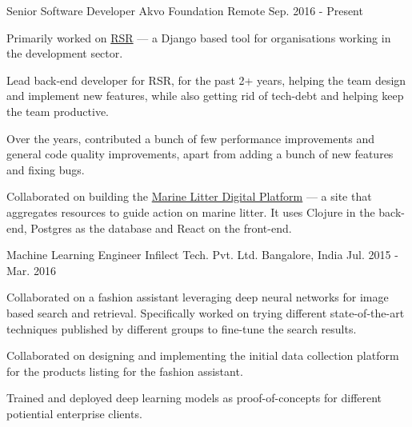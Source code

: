 

\begin{cventries}

  \cventry
      {Senior Software Developer} %
      {Akvo Foundation} %
      {Remote} %
      {Sep. 2016 - Present} %
      {
        \begin{cvitems} %
        \item {Primarily worked on \href{https://github.com/akvo/akvo-rsr}{RSR} --- a Django based tool for organisations working in the development sector.}
        \item {Lead back-end developer for RSR, for the past 2+ years, helping the team design and implement new features, while also getting rid of tech-debt and helping keep the team productive.}
        \item {Over the years, contributed a bunch of few performance improvements and general code quality improvements, apart from adding a bunch of new features and fixing bugs.}
        \item {Collaborated on building the \href{https://digital.gpmarinelitter.org/}{Marine Litter Digital Platform} --- a site that aggregates resources to guide action on marine litter. It uses Clojure in the back-end, Postgres as the database and React on the front-end.}
        \end{cvitems}
      }

  \cventry
    {Machine Learning Engineer} %
    {Infilect Tech. Pvt. Ltd.} %
    {Bangalore, India} %
    {Jul. 2015 - Mar. 2016} %
    {
      \begin{cvitems} %
      \item{Collaborated on a fashion assistant leveraging deep neural networks for image based search and retrieval. Specifically worked on trying different state-of-the-art techniques published by different groups to fine-tune the search results.}
        \item{Collaborated on designing and implementing the initial data collection platform for the products listing for the fashion assistant.}
        \item{Trained and deployed deep learning models as proof-of-concepts for different potiential enterprise clients.}
      \end{cvitems}
    }


\end{cventries}
